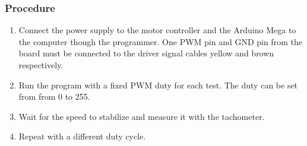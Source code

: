 \subsubsection{Procedure}
\begin{enumerate}
	\item Connect the power supply to the motor controller and the Arduino Mega to the computer though the programmer. One PWM pin and GND pin from the board must be connected to the driver signal cables yellow and brown respectively. 
	\item Run the program with a fixed PWM duty for each test. The duty can be set from from 0 to 255.
	\item Wait for the speed to stabilize and measure it with the tachometer. 
	\item Repeat with a different duty cycle.
\end{enumerate}

